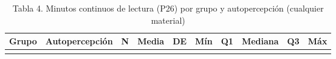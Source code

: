 \documentclass[
  spanish,
  12pt,
]{extarticle}
\begin{document}
\begin{longtable}[]{@{}
  >{\raggedright\arraybackslash}p{}
  >{\raggedright\arraybackslash}p{}
  >{\raggedleft\arraybackslash}p{}
  >{\raggedleft\arraybackslash}p{}
  >{\raggedleft\arraybackslash}p{}
  >{\raggedleft\arraybackslash}p{}
  >{\raggedleft\arraybackslash}p{}
  >{\raggedleft\arraybackslash}p{}
  >{\raggedleft\arraybackslash}p{}
  >{\raggedleft\arraybackslash}p{}@{}}
\caption{Tabla 4. Minutos continuos de lectura (P26) por grupo y
autopercepción (cualquier material)}\tabularnewline
\toprule\noalign{}
\begin{minipage}[b]{\linewidth}\raggedright
Grupo
\end{minipage} & \begin{minipage}[b]{\linewidth}\raggedright
Autopercepción
\end{minipage} & \begin{minipage}[b]{\linewidth}\raggedleft
N
\end{minipage} & \begin{minipage}[b]{\linewidth}\raggedleft
Media
\end{minipage} & \begin{minipage}[b]{\linewidth}\raggedleft
DE
\end{minipage} & \begin{minipage}[b]{\linewidth}\raggedleft
Mín
\end{minipage} & \begin{minipage}[b]{\linewidth}\raggedleft
Q1
\end{minipage} & \begin{minipage}[b]{\linewidth}\raggedleft
Mediana
\end{minipage} & \begin{minipage}[b]{\linewidth}\raggedleft
Q3
\end{minipage} & \begin{minipage}[b]{\linewidth}\raggedleft
Máx
\end{minipage} \\
\midrule\noalign{}
\endfirsthead
\toprule\noalign{}
\begin{minipage}[b]{\linewidth}\raggedright

\end{minipage}
\end{longtable}
\end{document}
